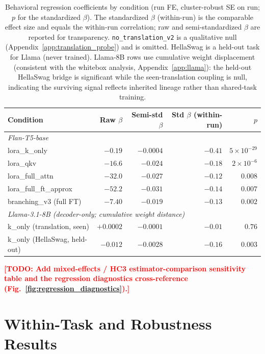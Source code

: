 \documentclass{article}
\newcommand{\TODO}[1]{\textcolor{red}{\textbf{[TODO: #1]}}}
\begin{document}
\begin{table}[h]
\caption{Behavioral regression coefficients by condition (run FE, cluster-robust SE on run; $p$ for
  the standardized $\beta$). The standardized $\beta$ (within-run) is the comparable effect size and
  equals the within-run correlation; raw and semi-standardized $\beta$ are reported for transparency.
  \texttt{no\_translation\_v2} is a qualitative null (Appendix~\ref{app:translation_probe}) and is
  omitted. HellaSwag is a held-out task for Llama (never trained). Llama-8B rows use cumulative
  weight displacement (consistent with the whitebox analysis, Appendix~\ref{app:llama}): the
  held-out HellaSwag bridge is significant while the seen-translation coupling is null, indicating
  the surviving signal reflects inherited lineage rather than shared-task training.}
\label{tab:regression_betas}
\begin{center}
\begin{tabular}{lrrrr}
\toprule
Condition & Raw $\beta$ & Semi-std $\beta$ & Std $\beta$ (within-run) & $p$ \\
\midrule
\multicolumn{5}{l}{\textit{Flan-T5-base}} \\
lora\_k\_only          & $-0.19$  & $-0.0004$ & $-0.41$ & $5\!\times\!10^{-29}$ \\
lora\_qkv              & $-16.6$  & $-0.024$  & $-0.18$ & $2\!\times\!10^{-6}$ \\
lora\_full\_attn       & $-32.0$  & $-0.027$  & $-0.12$ & $0.008$ \\
lora\_full\_ft\_approx & $-52.2$  & $-0.031$  & $-0.14$ & $0.007$ \\
branching\_v3 (full FT)& $-7.40$  & $-0.019$  & $-0.13$ & $0.002$ \\
\midrule
\multicolumn{5}{l}{\textit{Llama-3.1-8B (decoder-only; cumulative weight distance)}} \\
k\_only (translation, seen)   & $+0.0002$ & $-0.0001$ & $-0.01$ & $0.76$ \\
k\_only (HellaSwag, held-out) & $-0.012$  & $-0.0028$ & $-0.16$ & $0.003$ \\
\bottomrule
\end{tabular}
\end{center}
\end{table}

\TODO{Add mixed-effects / HC3 estimator-comparison sensitivity table and the regression diagnostics
  cross-reference (Fig.~\ref{fig:regression_diagnostics}).}

\section{Within-Task and Robustness Results}
\label{app:robustness}
\end{document}
